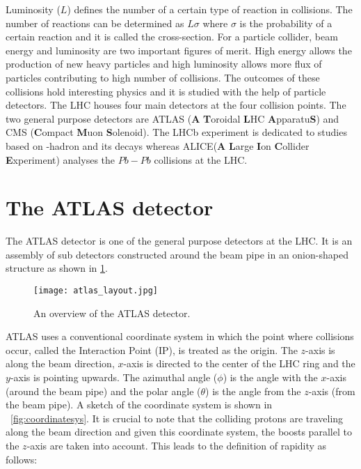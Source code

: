 Luminosity ($L$) defines the number of a certain type of reaction in collisions. The number of reactions can be determined as $L\sigma$ where $\sigma$ is the 
probability of a certain reaction and it is called the cross-section. For a particle collider, beam energy and luminosity are two important figures of merit. 
High energy allows the production of new heavy particles and high luminosity allows more flux of particles contributing to high number of collisions. The outcomes
of these collisions hold interesting physics and it is studied with the help of particle detectors. The LHC houses four main detectors at the four collision
points. The two general purpose detectors are ATLAS (\textbf{A} \textbf{T}oroidal \textbf{L}HC \textbf{A}pparatu\textbf{S})\cite{TheATLASCollaboration_2008} and
CMS (\textbf{C}ompact \textbf{M}uon \textbf{S}olenoid)\cite{TheCMSCollaboration_2008}. The LHCb experiment\cite{TheLHCbCollaboration_2008} is dedicated to 
studies based on \PB-hadron and its decays whereas ALICE(\textbf{A} \textbf{L}arge \textbf{I}on \textbf{C}ollider \textbf{E}xperiment)\cite{TheALICECollaboration_2008}
analyses the $Pb-Pb$ collisions at the LHC. 


\section{The ATLAS detector}
The ATLAS detector is one of the general purpose detectors at the LHC. It is an assembly of sub detectors constructed around the beam pipe in an onion-shaped structure as shown
in \cref{fig:atlas}.

\begin{figure}[htbp]
    \centering
    \texttt{[image: atlas\_layout.jpg]}
    \caption[Overview of the ATLAS detector]{An overview of the ATLAS detector\cite{Pequenao:1095924}.}%
    \label{fig:atlas}
\end{figure}

ATLAS uses a conventional coordinate system in which the point where collisions occur, called the Interaction Point (IP), is treated as the origin. The 
$z$-axis is along the beam direction, $x$-axis is directed to the center of the LHC ring and the $y$-axis is pointing upwards. The azimuthal angle ($\phi$) 
is the angle with the $x$-axis (around the beam pipe) and the polar angle ($\theta$) is the angle from the $z$-axis (from the beam pipe). A sketch of the coordinate
system is shown in ~\cref{fig:coordinatesys}. It is crucial to note that the colliding protons are traveling along the beam direction and given this coordinate 
system, the boosts parallel to the $z$-axis are 
taken into account. This leads to the definition of rapidity as follows:

